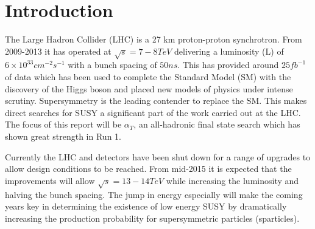 
\chapter{Introduction} %

\label{Chapter1} %


The Large Hadron Collider (LHC) is a 27 km proton-proton synchrotron. From 2009-2013 it has operated at $\sqrt{s}=7-8TeV$ delivering a luminosity (L) of $6 \times 10^{33} cm^{-2}s^{-1}$ with a bunch spacing of $50ns$\cite{run1}. This has provided around $25fb^{-1}$ of data which has been used to complete the Standard Model (SM) with the discovery of the Higgs boson and placed new models of physics under intense scrutiny\cite{cmshiggs}\cite{atlashiggs}\cite{susyr1}. Supersymmetry is the leading contender to replace the SM. This makes direct searches for SUSY a significant part of the work carried out at the LHC. The focus of this report will be $\alpha_T$, an all-hadronic final state search which has shown great strength in Run 1\cite{search}. 

Currently the LHC and detectors have been shut down for a range of upgrades to allow design conditions to be reached\cite{ls1}. From mid-2015 it is expected that the improvements will allow $\sqrt{s}=13-14TeV$ while increasing the luminosity and halving the bunch spacing. The jump in energy especially will make the coming years key in determining the existence of low energy SUSY by dramatically increasing the production probability for supersymmetric particles (sparticles)\cite{ProjectedCx}.




